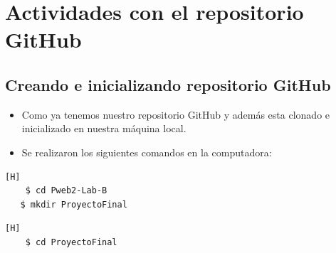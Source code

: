 \section{Actividades con el repositorio GitHub}

\subsection{Creando e inicializando repositorio GitHub}
\begin{itemize}	
	\item Como ya tenemos nuestro repositorio GitHub y además esta clonado e inicializado en nuestra máquina local.
	\item Se realizaron los siguientes comandos en la computadora:
\end{itemize}	

\begin{lstlisting}[language=bash,caption={Creando carpeta de trabajo dentro de nuestro repositorio clonado en mi maquina local}][H]
	$ cd Pweb2-Lab-B
   $ mkdir ProyectoFinal
\end{lstlisting}
\begin{lstlisting}[language=bash,caption={Dirijíéndonos a la carpeta de trabajo}][H]
	$ cd ProyectoFinal
\end{lstlisting}	
